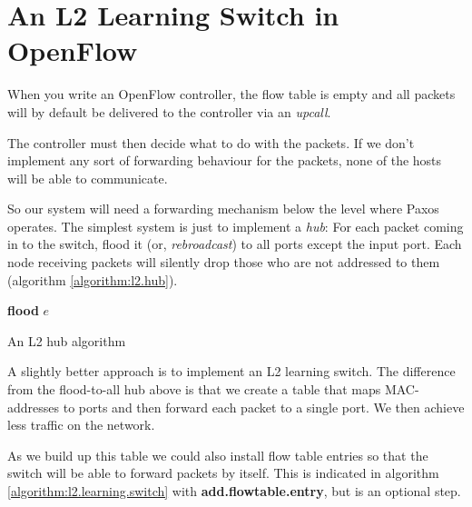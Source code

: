 \section{An L2 Learning Switch in OpenFlow}
\label{chapter:l2.learning.switch}

When you write an OpenFlow controller, the flow table is empty and all
packets will by default be delivered to the controller via an
\textit{upcall}.

The controller must then decide what to do with the packets.  If we don't
implement any sort of forwarding behaviour for the packets, none of the
hosts will be able to communicate.

So our system will need a forwarding mechanism below the level where Paxos
operates.
%
The simplest system is just to implement a \textit{hub}:  For
each packet coming in to the switch, flood it (or,
\textit{rebroadcast}) to all ports except the
input port.
%
Each node receiving packets will silently drop those who are not addressed
to them (algorithm \ref{algorithm:l2.hub}).

\begin{algorithm}
  \begin{algorithmic}
      \State \textbf{flood} $e$ 
    \EndOn
  \end{algorithmic}
  \caption{An L2 hub algorithm}
  \label{algorithm:l2.hub}
\end{algorithm}

A slightly better approach is to implement an \ac{L2} learning
switch.
The difference from the flood-to-all hub above is that we create a table
that maps MAC-addresses to ports and then forward each packet to a single
port.  We then achieve less traffic on the network.

As we build up this table we could also install flow table entries so that the
switch will be able to forward packets by itself.  This is indicated in
algorithm \vref{algorithm:l2.learning.switch} with
\textbf{add.flowtable.entry}, but is an optional step.

